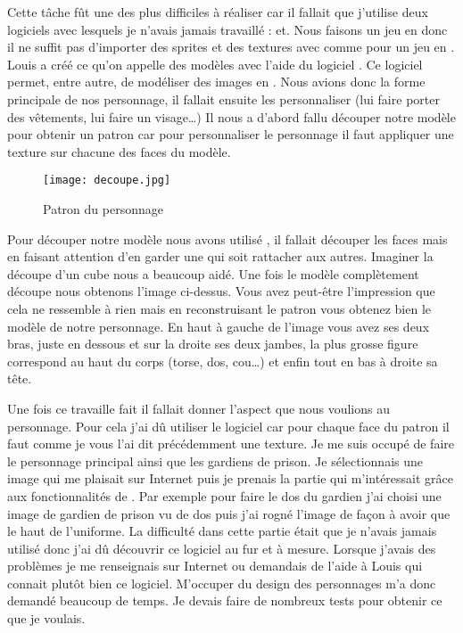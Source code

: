 \documentclass{article}
\begin{document}
\par
Cette tâche fût une des plus difficiles à réaliser car il fallait que j’utilise deux logiciels avec lesquels je n’avais jamais travaillé : et. Nous faisons un jeu en  donc il ne suffit pas d’importer des sprites et des textures avec  comme pour un jeu en . Louis a créé ce qu’on appelle des modèles avec l’aide du logiciel . Ce logiciel permet, entre autre, de modéliser des images en . Nous avions donc la forme principale de nos personnage, il fallait ensuite les personnaliser (lui faire porter des vêtements, lui faire un visage…) Il nous a d’abord fallu découper notre modèle pour obtenir un patron car pour personnaliser le personnage il faut appliquer une texture sur chacune des faces du modèle.
\newline

\begin{figure}[t]
\begin{center}
\texttt{[image: decoupe.jpg]}
\caption{Patron du personnage}
\end{center}
\end{figure}

\newpage

\par
Pour découper notre modèle nous avons utilisé , il fallait découper les faces mais en faisant attention d’en garder une qui soit rattacher aux autres. Imaginer la découpe d’un cube nous a beaucoup aidé. Une fois le modèle complètement découpe nous obtenons l’image ci-dessus.         
Vous avez peut-être l’impression que cela ne ressemble à rien mais en reconstruisant le patron vous obtenez bien le modèle de notre personnage. En haut à gauche de l’image vous avez ses deux bras, juste en dessous et sur la droite ses deux jambes, la plus grosse figure correspond au haut du corps (torse, dos, cou…) et enfin tout en bas à droite sa tête.

\par
Une fois ce travaille fait il fallait donner l’aspect que nous voulions au personnage. Pour cela j’ai dû utiliser le logiciel  car pour chaque face du patron il faut comme je vous l’ai dit précédemment une texture. Je me suis occupé de faire le personnage principal ainsi que les gardiens de prison. Je sélectionnais une image qui me plaisait sur Internet puis je prenais la partie qui m’intéressait grâce aux fonctionnalités de . Par exemple pour faire le dos du gardien j’ai choisi une image de gardien de prison vu de dos puis j’ai rogné l’image de façon à avoir que le haut de l’uniforme. La difficulté dans cette partie était que je n’avais jamais utilisé  donc j’ai dû  découvrir ce logiciel au fur et à mesure. Lorsque j’avais des problèmes je me renseignais sur Internet ou demandais de l’aide à Louis qui connait plutôt bien ce logiciel. M’occuper du design des personnages m’a donc demandé beaucoup de temps. Je devais faire de nombreux tests pour obtenir ce que je voulais.    
\newline
\end{document}
